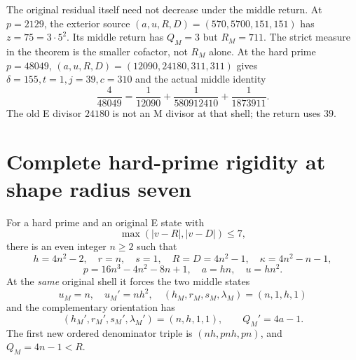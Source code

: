 The original residual itself need not decrease under the middle return.
At $p=2129$, the exterior source $(a,u,R,D)=(570,5700,151,151)$ has
$z=75=3\cdot5^2$. Its middle return has $Q_M=3$ but $R_M=711$.
The strict measure in the theorem is the smaller cofactor, not $R_M$ alone.
At the hard prime $p=48049$, $(a,u,R,D)=(12090,24180,311,311)$ gives
$\delta=155,t=1,j=39,c=310$ and the actual middle identity
\[
 \boxed{\frac4{48049}=\frac1{12090}+\frac1{580912410}
                         +\frac1{1873911}.}              \tag{13}
\]
The old E divisor $24180$ is not an M divisor at that shell; the return uses $39$.

\section{Complete hard-prime rigidity at shape radius seven}
\begin{theorem}\label{thm:rigid}
For a hard prime and an original E state with
\[
 \max(|v-R|,|v-D|)\le7,
\]
there is an even integer $n\ge2$ such that
\[
 \boxed{h=4n^2-2,\quad r=n,\quad s=1,\quad
 R=D=4n^2-1,\quad\kappa=4n^2-n-1,}                       \tag{14}
\]
\[
 p=16n^3-4n^2-8n+1,\quad a=hn,\quad u=hn^2.
\]
At the \emph{same} original shell it forces the two middle states
\[
 \boxed{u_M=n,\quad u_M'=nh^2,\quad
 (h_M,r_M,s_M,\lambda_M)=(n,1,h,1)}                       \tag{15}
\]
and the complementary orientation has
\[
 (h_M',r_M',s_M',\lambda_M')=(n,h,1,1),\qquad
 Q_M'=4a-1.
\]
The first new ordered denominator triple is
$(nh,pnh,pn)$, and $Q_M=4n-1<R$.
\end{theorem}
